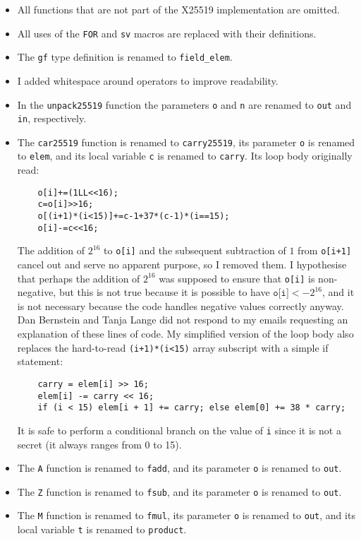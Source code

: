 \documentclass[manuscript]{acmart}
\begin{document}
\begin{itemize}
    \item All functions that are not part of the X25519 implementation are omitted.
    \item All uses of the \verb|FOR| and \verb|sv| macros are replaced with their definitions.
    \item The \verb|gf| type definition is renamed to \verb|field_elem|.
    \item I added whitespace around operators to improve readability.
    \item In the \verb|unpack25519| function the parameters \verb|o| and \verb|n| are renamed to \verb|out| and \verb|in|, respectively.
    \item The \verb|car25519| function is renamed to \verb|carry25519|, its parameter \verb|o| is renamed to \verb|elem|, and its local variable \verb|c| is renamed to \verb|carry|.
        Its loop body originally read:
\begin{verbatim}
    o[i]+=(1LL<<16);
    c=o[i]>>16;
    o[(i+1)*(i<15)]+=c-1+37*(c-1)*(i==15);
    o[i]-=c<<16;
\end{verbatim}
        The addition of $2^{16}$ to \verb|o[i]| and the subsequent subtraction of $1$ from \verb|o[i+1]| cancel out and serve no apparent purpose, so I removed them.
        I hypothesise that perhaps the addition of $2^{16}$ was supposed to ensure that \verb|o[i]| is non-negative, but this is not true because it is possible to have $\texttt{o[i]} < -2^{16}$, and it is not necessary because the code handles negative values correctly anyway.
        Dan Bernstein and Tanja Lange did not respond to my emails requesting an explanation of these lines of code.
        My simplified version of the loop body also replaces the hard-to-read \verb|(i+1)*(i<15)| array subscript with a simple if statement:
\begin{verbatim}
    carry = elem[i] >> 16;
    elem[i] -= carry << 16;
    if (i < 15) elem[i + 1] += carry; else elem[0] += 38 * carry;
\end{verbatim}
        It is safe to perform a conditional branch on the value of \verb|i| since it is not a secret (it always ranges from 0 to 15).
    \item The \verb|A| function is renamed to \verb|fadd|, and its parameter \verb|o| is renamed to \verb|out|.
    \item The \verb|Z| function is renamed to \verb|fsub|, and its parameter \verb|o| is renamed to \verb|out|.
    \item The \verb|M| function is renamed to \verb|fmul|, its parameter \verb|o| is renamed to \verb|out|, and its local variable \verb|t| is renamed to \verb|product|.

\end{itemize}
\end{document}
